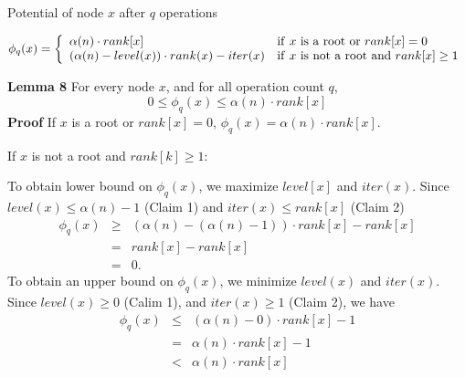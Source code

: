 \documentclass{beamer}
\begin{document}
\begin{frame}{}

\centerline {\large Potential of node $x$ after $q$ operations}
\begin{small}
\begin{equation}
\phi_q(x)=\left\{
\begin{array} {ll}
\alpha(n)\cdot rank[x] & {\rm if\ }x{\rm\ is\ a\ root\ or\ }rank[x]=0 \\
(\alpha(n)-level(x))\cdot rank(x) - iter(x) & {\rm if\ }x{\rm\ is\ not\ a\ root\ and\ }rank[x]\ge 1
\end{array}
\right.
\end{equation}
\end{small}
\end{frame}

\begin{frame}{}

{\bf Lemma 8} For every node $x$, and for all operation count $q$,
$$0\le \phi_q(x)\le\alpha(n)\cdot rank[x]$$
{\bf Proof} If $x$ is a root or $rank[x]=0$, $\phi_q(x)=\alpha(n)\cdot rank[x]$.

If $x$ is not a root and $rank[k]\ge 1$:

To obtain lower bound on $\phi_q(x)$, we maximize $level[x]$ and $iter(x)$.
Since $level(x)\le\alpha(n)-1$ (Claim 1) and $iter(x)\le rank[x]$ (Claim 2)
\begin{eqnarray*}
\phi_q(x) &\ge& (\alpha(n)-(\alpha(n)-1))\cdot rank[x]-rank[x] \\
 &=& rank[x]-rank[x] \\
 &=& 0. 
\end{eqnarray*}
To obtain an upper bound on $\phi_q(x)$, we minimize $level(x)$ and $iter(x)$. 
Since $level(x)\ge 0$ (Calim 1), and $iter(x)\ge 1$ (Claim 2), we have
\begin{eqnarray*}
\phi_q(x) &\le& (\alpha(n)-0)\cdot rank[x] -1 \\
 &=& \alpha(n)\cdot rank[x]-1 \\
 &<& \alpha(n)\cdot rank[x]
\end{eqnarray*}
\end{frame}
\end{document}
